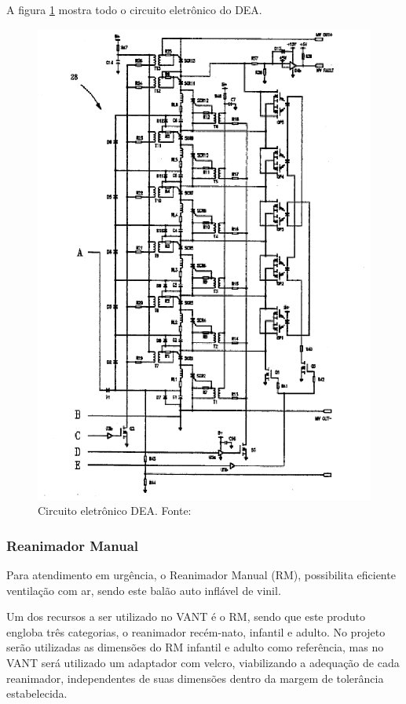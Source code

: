 A figura \ref{fig:circuitodea} mostra todo o circuito eletrônico do DEA.

\begin{figure}[h!]
	\centering
		\includegraphics[keepaspectratio=true,scale=1.2,angle=-90]{figuras/circuitodea.eps}
	\caption{Circuito eletrônico DEA. Fonte: \cite{dea}}
	\label{fig:circuitodea}
\end{figure}

\subsubsection{Reanimador Manual}
Para atendimento em urgência, o Reanimador Manual (RM), possibilita eficiente ventilação com ar, sendo este balão auto inflável de vinil.

Um dos recursos a ser utilizado no VANT é o RM, sendo que este produto engloba três categorias, o reanimador recém-nato, infantil e adulto. No projeto serão utilizadas as dimensões do RM infantil e adulto como referência, mas no VANT será utilizado um adaptador com velcro, viabilizando a adequação de cada reanimador, independentes de suas dimensões dentro da margem de tolerância estabelecida.


